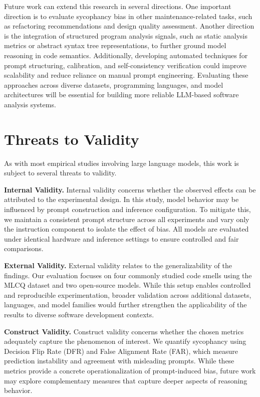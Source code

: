 \documentclass[sigconf,review,anonymous]{acmart}
\begin{document}
Future work can extend this research in several directions. One important direction is to evaluate sycophancy bias in other maintenance-related tasks, such as refactoring recommendations and design quality assessment. Another direction is the integration of structured program analysis signals, such as static analysis metrics or abstract syntax tree representations, to further ground model reasoning in code semantics. Additionally, developing automated techniques for prompt structuring, calibration, and self-consistency verification could improve scalability and reduce reliance on manual prompt engineering. Evaluating these approaches across diverse datasets, programming languages, and model architectures will be essential for building more reliable LLM-based software analysis systems.

\section{Threats to Validity}

As with most empirical studies involving large language models, this work is subject to several threats to validity.

\textbf{Internal Validity.}
Internal validity concerns whether the observed effects can be attributed to the experimental design. In this study, model behavior may be influenced by prompt construction and inference configuration. To mitigate this, we maintain a consistent prompt structure across all experiments and vary only the instruction component to isolate the effect of bias. All models are evaluated under identical hardware and inference settings to ensure controlled and fair comparisons.

\textbf{External Validity.}
External validity relates to the generalizability of the findings. Our evaluation focuses on four commonly studied code smells using the MLCQ dataset and two open-source models. While this setup enables controlled and reproducible experimentation, broader validation across additional datasets, languages, and model families would further strengthen the applicability of the results to diverse software development contexts.

\textbf{Construct Validity.}
Construct validity concerns whether the chosen metrics adequately capture the phenomenon of interest. We quantify sycophancy using Decision Flip Rate (DFR) and False Alignment Rate (FAR), which measure prediction instability and agreement with misleading prompts. While these metrics provide a concrete operationalization of prompt-induced bias, future work may explore complementary measures that capture deeper aspects of reasoning behavior.
\end{document}
